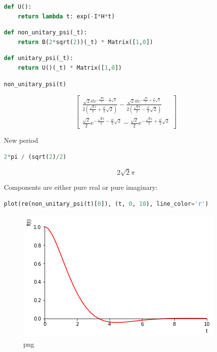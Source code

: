 \begin{lstlisting}[language=Python]
def U():
    return lambda t: exp(-I*H*t)
\end{lstlisting}

\begin{lstlisting}[language=Python]
def non_unitary_psi(_t):
    return B(2*sqrt(2))(_t) * Matrix([1,0])
\end{lstlisting}

\begin{lstlisting}[language=Python]
def unitary_psi(_t):
    return U()(_t) * Matrix([1,0])
\end{lstlisting}

\begin{lstlisting}[language=Python]
non_unitary_psi(t)
\end{lstlisting}

\[\left[\begin{matrix}\frac{\sqrt{2} i t e^{- \frac{\sqrt{2} t}{2} - \frac{i t}{2} \sqrt{2}}}{2 \left(\frac{\sqrt{2} t}{2} + \frac{i t}{2} \sqrt{2}\right)} - \frac{\sqrt{2} i t e^{- \frac{\sqrt{2} t}{2} + \frac{i t}{2} \sqrt{2}}}{2 \left(\frac{\sqrt{2} t}{2} - \frac{i t}{2} \sqrt{2}\right)}\\\frac{\sqrt{2}}{2} e^{- \frac{\sqrt{2} t}{2} - \frac{i t}{2} \sqrt{2}} - \frac{\sqrt{2}}{2} e^{- \frac{\sqrt{2} t}{2} + \frac{i t}{2} \sqrt{2}}\end{matrix}\right]\]

New period

\begin{lstlisting}[language=Python]
2*pi / (sqrt(2)/2)
\end{lstlisting}

\[2 \sqrt{2} \pi\]

Components are either pure real or pure imaginary:

\begin{lstlisting}[language=Python]
plot(re(non_unitary_psi(t)[0]), (t, 0, 10), line_color='r')
\end{lstlisting}

\begin{figure}
\centering
\includegraphics[width=0.66\linewidth]{output_20_0.png}
\caption{png}
\end{figure}

